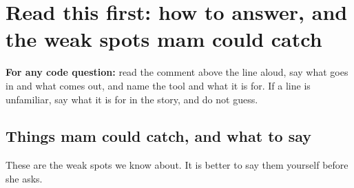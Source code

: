 \section{Read this first: how to answer, and the weak spots mam could catch}\label{ch:start}

\textbf{For any code question:}\label{sec:method} read the comment above the line aloud, say what goes in and what comes out, and name the tool and what it is for. If a line is unfamiliar, say what it is for in the story, and do not guess.

\subsection{Things mam could catch, and what to say}\label{sec:risks}
These are the weak spots we know about. It is better to say them yourself before she asks.
